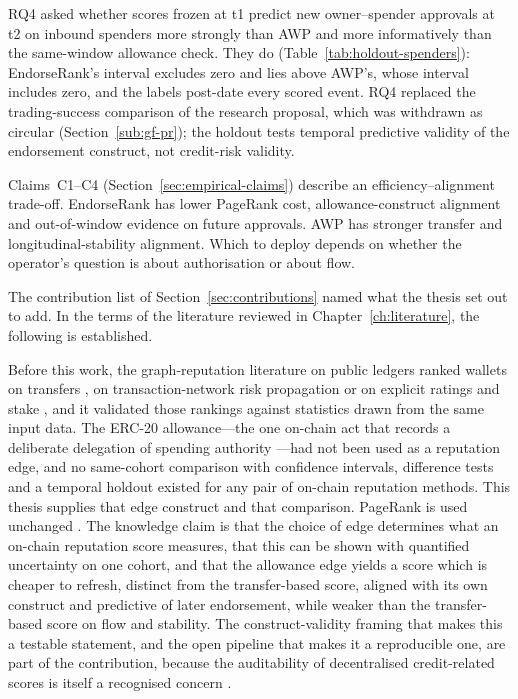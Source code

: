 RQ4 asked whether scores frozen at t1 predict new owner--spender approvals at t2 on inbound spenders more strongly than AWP and more informatively than the same-window allowance check. They do (Table~\ref{tab:holdout-spenders}): EndorseRank's interval excludes zero and lies above AWP's, whose interval includes zero, and the labels post-date every scored event. RQ4 replaced the trading-success comparison of the research proposal, which was withdrawn as circular (Section~\ref{sub:gf-pr}); the holdout tests temporal predictive validity of the endorsement construct, not credit-risk validity.

Claims~C1--C4 (Section~\ref{sec:empirical-claims}) describe an efficiency--alignment trade-off. EndorseRank has lower PageRank cost, allowance-construct alignment and out-of-window evidence on future approvals. AWP has stronger transfer and longitudinal-stability alignment. Which to deploy depends on whether the operator's question is about authorisation or about flow.


The contribution list of Section~\ref{sec:contributions} named what the thesis set out to add. In the terms of the literature reviewed in Chapter~\ref{ch:literature}, the following is established.

Before this work, the graph-reputation literature on public ledgers ranked wallets on transfers , on transaction-network risk propagation  or on explicit ratings and stake , and it validated those rankings against statistics drawn from the same input data. The ERC-20 allowance---the one on-chain act that records a deliberate delegation of spending authority ---had not been used as a reputation edge, and no same-cohort comparison with confidence intervals, difference tests and a temporal holdout existed for any pair of on-chain reputation methods. This thesis supplies that edge construct and that comparison. PageRank is used unchanged . The knowledge claim is that the choice of edge determines what an on-chain reputation score measures, that this can be shown with quantified uncertainty on one cohort, and that the allowance edge yields a score which is cheaper to refresh, distinct from the transfer-based score, aligned with its own construct and predictive of later endorsement, while weaker than the transfer-based score on flow and stability. The construct-validity framing  that makes this a testable statement, and the open pipeline that makes it a reproducible one, are part of the contribution, because the auditability of decentralised credit-related scores is itself a recognised concern .

